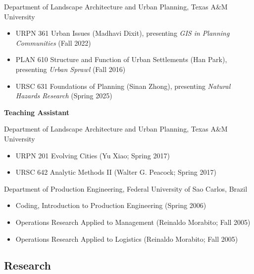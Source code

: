 \documentclass[11pt,oneside]{article}
\begin{document}
{Department of Landscape Architecture and Urban Planning, Texas A\&M University}
\begin{itemize}[leftmargin=20pt]
\item URPN 361 Urban Issues (Madhavi Dixit), presenting \emph{GIS in Planning Communities} (Fall 2022)
\item PLAN 610 Structure and Function of Urban Settlements (Han Park), presenting \emph{Urban Sprawl} (Fall 2016)
\item URSC 631 Foundations of Planning (Sinan Zhong), presenting \emph{Natural Hazards Research} (Spring 2025)
\end{itemize}

\newpage
\pagestyle{main}

\textbf{Teaching Assistant}

\vspace{3pt}

{Department of Landscape Architecture and Urban Planning, Texas A\&M University}
\begin{itemize}[leftmargin=20pt]
\item URPN 201 Evolving Cities (Yu Xiao; Spring 2017)
\item URSC 642 Analytic Methods II (Walter G. Peacock; Spring 2017)
\end{itemize}

\vspace{3pt}

{Department of Production Engineering, Federal University of Sao Carlos, Brazil}
\begin{itemize}[leftmargin=20pt]
\item Coding, Introduction to Production Engineering (Spring 2006)
\item Operations Research Applied to Management (Reinaldo Morabito; Fall 2005)
\item Operations Research Applied to Logistics (Reinaldo Morabito; Fall 2005)
\end{itemize}

\subsection*{Research}
\end{document}
